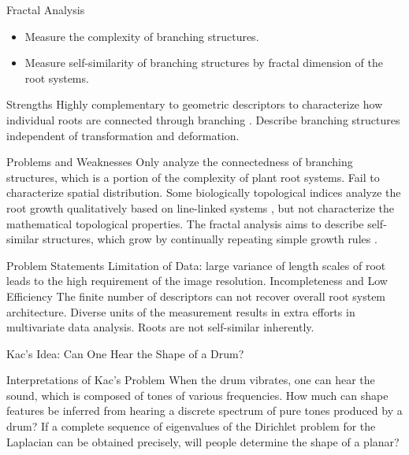 \documentclass{article}
\begin{document}
\begin{outline}[enumerate]
       \4 Fractal Analysis \cite{tatsumi1989fractal}
         \begin{itemize}
            \item Measure the complexity of branching structures.
            \item Measure self-similarity of branching structures by fractal dimension of the root systems.
         \end{itemize}

     \3 Strengths
       \4 Highly complementary to geometric descriptors to characterize how individual roots are connected through branching \cite{delory2018archidart}.
       \4 Describe branching structures independent of transformation and deformation.

     \3 Problems and Weaknesses
       \4 Only analyze the connectedness of branching structures, which is a portion of the complexity of plant root systems.
       \4 Fail to characterize spatial distribution.
       \4 Some biologically topological indices analyze the root growth qualitatively based on line-linked systems \cite{fitter1986topology}, but not characterize the mathematical topological properties.
       \4 The fractal analysis aims to describe self-similar structures, which grow by continually repeating simple growth rules \cite{fitter1992fractal}.

  \1 Problem Statements
    \2 Limitation of Data: large variance of length scales of root leads to the high requirement of the image resolution.
    \2 Incompleteness and Low Efficiency
      \3 The finite number of descriptors can not recover overall root system architecture.
      \3 Diverse units of the measurement results in extra efforts in multivariate data analysis.
      \3 Roots are not self-similar inherently.

    
  \newpage
      

  \1 Kac’s Idea: Can One Hear the Shape of a Drum? \cite{kac1966can}
  
    \2 Interpretations of Kac's Problem
      \3 When the drum vibrates, one can hear the sound, which is composed of tones of various frequencies. How much can shape features be inferred from hearing a discrete spectrum of pure tones produced by a drum?
      \3 If a complete sequence of eigenvalues of the Dirichlet problem for the Laplacian can be obtained precisely, will people determine the shape of a planar?
      

\end{outline}
\end{document}
